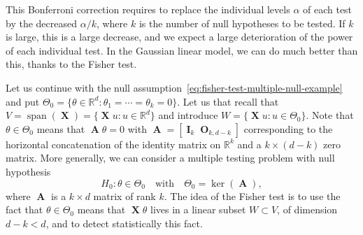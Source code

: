 \documentclass[
	fontsize=11pt, %
	twoside=false, %
	numbers=noenddot, %
]{kaobook}
\DeclareMathOperator{\bA}{{\boldsymbol A}}
\DeclareMathOperator{\bI}{{\boldsymbol I}}
\DeclareMathOperator{\bO}{{\boldsymbol O}}
\DeclareMathOperator{\bX}{{\boldsymbol X}}
\DeclareMathOperator*{\spa}{span}
\newcommand{\R}{\mathbb R}
\begin{document}
This Bonferroni correction requires to replace the individual levels $\alpha$ of each test by the decreased $\alpha /k$, where $k$ is the number of null hypotheses to be tested.
If $k$ is large, this is a large decrease, and we expect a large deterioration of the power of each individual test.
In the Gaussian linear model, we can do much better than this, thanks to the Fisher test.

Let us continue with the null assumption~\eqref{eq:fisher-test-multiple-null-example} and put $\Theta_0 = \{ \theta \in \R^d : \theta_1 = \cdots = \theta_k = 0 \}$. 
Let us that recall that $V = \spa(\bX) = \{ \bX u : u \in \R^d\}$ and introduce $W = \{ \bX u : u \in \Theta_0 \}$. 
Note that $\theta \in \Theta_0$ means that $\bA \theta = 0$ with $\bA = [\bI_k \bO_{k, d-k}]$ corresponding to the horizontal concatenation of the identity matrix on $\R^k$ and a $k \times (d-k)$ zero matrix.
More generally, we can consider a multiple testing problem with null hypothesis
\begin{equation}
	\label{eq:fisher-null-hypothesis}
	H_0 : \theta \in \Theta_0 \quad \text{with} \quad \Theta_0 = \ker(\bA),
\end{equation}
where $\bA$ is a $k \times d$ matrix of rank $k$.
The idea of the Fisher test is to use the fact that $\theta \in \Theta_0$ means that $\bX \theta$ lives in a linear subset $W \subset V$, of dimension $d - k < d$, and to detect statistically this fact.
\end{document}
